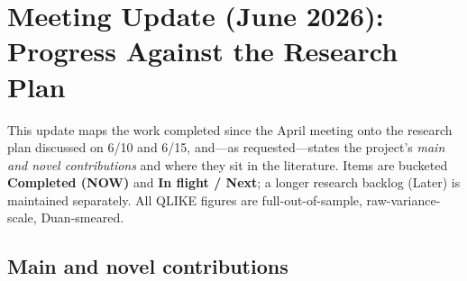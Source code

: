 \section{Meeting Update (June 2026): Progress Against the Research Plan}
\label{sec:meeting_update_2026_06}

This update maps the work completed since the April meeting onto the research
plan discussed on 6/10 and 6/15, and---as requested---states the project's
\emph{main and novel contributions} and where they sit in the literature. Items
are bucketed \textbf{Completed (NOW)} and \textbf{In flight / Next}; a longer
research backlog (Later) is maintained separately. All QLIKE figures are
full-out-of-sample, raw-variance-scale, Duan-smeared.

\subsection{Main and novel contributions}
\label{sec:contributions_june}

